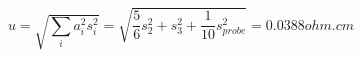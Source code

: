 

\[
u = \sqrt{\sum_{i}{a_{i}^{2} s_{i}^{2}}} = \sqrt{\frac{5}{6}s_{2}^{2} + s_{3}^{2} + \frac{1}{10} s_{probe}^{2}} = 0.0388 ohm.cm
\]


